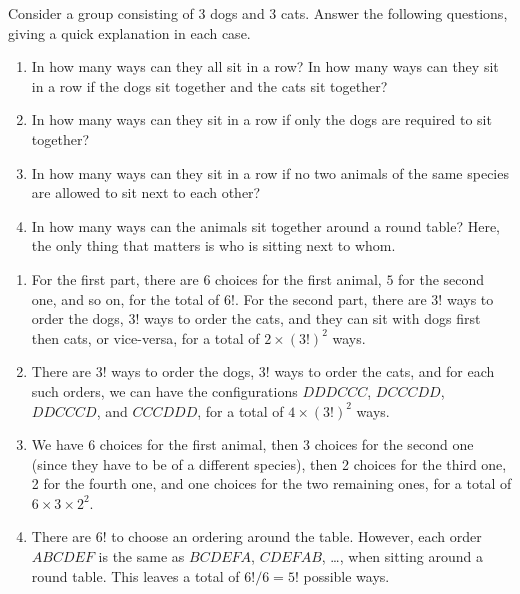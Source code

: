 \documentclass{article}
\theoremstyle{definition}
\begin{document}
\begin{question}
Consider a group consisting of 3 dogs and 3 cats. Answer the following questions, giving a quick explanation in each case.

\begin{enumerate}
	\item In how many ways can they all sit in a row? In how many ways can they sit in a row if the dogs sit together and the cats sit together?
	\item In how many ways can they sit in a row if only the dogs are required to sit together?
	\item In how many ways can they sit in a row if no two animals of the same species are allowed to sit next to each other?
	\item In how many ways can the animals sit together around a round table? Here, the only thing that matters is who is sitting next to whom.
\end{enumerate}
\end{question}
\begin{solution}
\begin{enumerate}
	\item For the first part, there are $6$ choices for the first animal, $5$ for the second one, and so on, for the total of $6!$. For the second part, there are $3!$ ways to order the dogs, $3!$ ways to order the cats, and they can sit with dogs first then cats, or vice-versa, for a total of $2 \times (3!)^2$ ways.
	
	\item There are $3!$ ways to order the dogs, $3!$ ways to order the cats, and for each such orders, we can have the configurations $DDDCCC$, $DCCCDD$, $DDCCCD$, and $CCCDDD$, for a total of $4 \times (3!)^2$ ways.
	
	\item We have 6 choices for the first animal, then 3 choices for the second one (since they have to be of a different species), then 2 choices for the third one, 2 for the fourth one, and one choices for the two remaining ones, for a total of $6 \times 3 \times 2^2$.
	
	\item There are $6!$ to choose an ordering around the table. However, each order $ABCDEF$ is the same as $BCDEFA$, $CDEFAB$, \dots, when sitting around a round table. This leaves a total of $6! / 6 = 5!$ possible ways.
	
\end{enumerate}

\end{solution}
\end{document}
